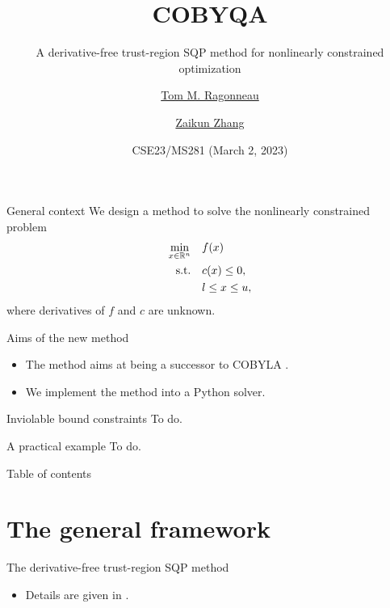 \documentclass[
]{presentation}
\title{COBYQA}
\subtitle{A derivative-free trust-region SQP method for nonlinearly constrained optimization}
\date{CSE23/MS281 (March 2, 2023)}
\author{\href{https://www.tomragonneau.com/}{Tom M. Ragonneau} \and \href{https://www.zhangzk.net/}{Zaikun Zhang}}
\institute{
    Department of Applied Mathematics\\
    The Hong Kong Polytechnic University
}
\newcommand{\obj}{f}
\newcommand{\con}{c}
\newcommand{\xl}{l}
\newcommand{\xu}{u}
\begin{document}
\maketitle

\begin{frame}{General context}
    We design a method to solve the nonlinearly constrained problem
    \begin{align*}
        \min_{x \in \R^n}   & \quad \obj(x)\\
        \mathrm{s.t.}       & \quad \con(x) \le 0,\\
                            & \quad \xl \le x \le \xu,
    \end{align*}
    where derivatives of $\obj$ and $\con$ are \alert{unknown}.

    \medskip

    \begin{block}{Aims of the new method}
        \begin{itemize}
            \item The method aims at being a \alert{successor} to COBYLA \parencite{Powell_1994}.
            \item We \alert{implement} the method into a Python solver.
        \end{itemize}
    \end{block}
\end{frame}

\begin{frame}{Inviolable bound constraints}
    To do.
\end{frame}

\begin{frame}{A practical example}
    To do.
\end{frame}

\begin{frame}{Table of contents}
    \tableofcontents[hideallsubsections]
\end{frame}

\section{The general framework}

\begin{frame}{The derivative-free trust-region SQP method}
    \begin{itemize}
        \item Details are given in \textcite{Ragonneau_2022}.
    \end{itemize}
\end{frame}
\end{document}
